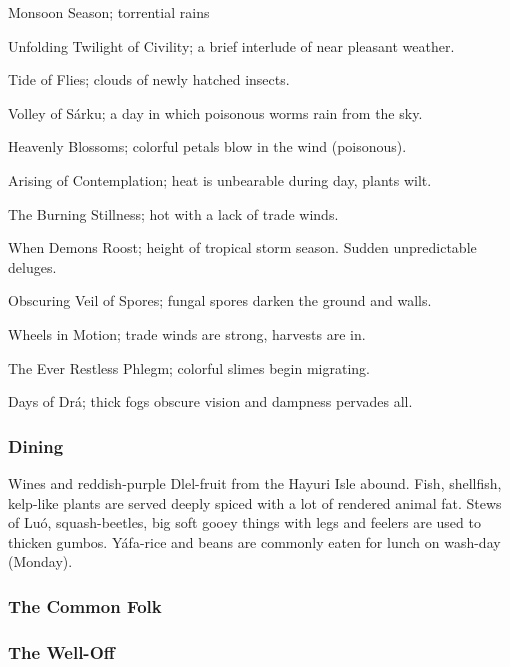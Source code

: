 \begin{description}[font=\sffamily\bfseries, leftmargin=1cm]
\item[Hasanpor] Monsoon Season; torrential rains
\item[Shapru]   Unfolding Twilight of Civility; a brief interlude of near pleasant weather.
\item[Didom]    Tide of Flies; clouds of newly hatched insects.
\item[Langala]  Volley of Sárku; a day in which poisonous worms rain from the sky.
\item[Fesru]    Heavenly Blossoms; colorful petals blow in the wind (poisonous).
\item[Drenggar] Arising of Contemplation; heat is unbearable during day, plants wilt.
\item[Firasul]  The Burning Stillness; hot with a lack of trade winds.
\item[Pardan]   When Demons Roost; height of tropical storm season. Sudden unpredictable deluges. 
\item[Halir]    Obscuring Veil of Spores; fungal spores darken the ground and walls.
\item[Trantor]  Wheels in Motion; trade winds are strong, harvests are in.
\item[Lesdrim]  The Ever Restless Phlegm; colorful slimes begin migrating.
\item[Dohala]   Days of Drá; thick fogs obscure vision and dampness pervades all.
\end{description}

\subsubsection{Dining}

Wines and reddish-purple Dlel-fruit from the Hayuri Isle abound. Fish, shellfish, kelp-like plants are served deeply spiced with a lot of rendered animal fat. Stews of  Luó, squash-beetles, big soft gooey things with legs and feelers are used to thicken gumbos. Yáfa-rice and beans are commonly eaten for lunch on wash-day (Monday). 


\subsubsection{The Common Folk}

\subsubsection{The Well-Off}

